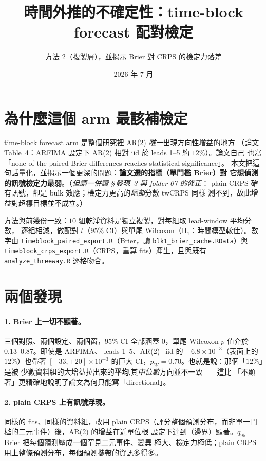 \documentclass[12pt]{article}
\title{\textbf{時間外推的不確定性：time-block forecast 配對檢定}}
\author{方法 2（複製層），並揭示 Brier 對 CRPS 的檢定力落差}
\date{2026 年 7 月}
\begin{document}
\maketitle

\section*{為什麼這個 arm 最該補檢定}

time-block forecast arm 是整個研究裡 AR(2) \emph{唯一}出現方向性增益的地方
（論文 Table~4：ARFIMA 設定下 AR(2) 相對 iid 於 leads 1--5 約 $12\%$）。論文自己
也寫「none of the paired Brier differences reaches statistical significance」。
本文把這句話量化，並揭示一個更深的問題：\textbf{論文選的指標（單門檻 Brier）對
它想偵測的訊號檢定力最弱}。（\emph{但請一併讀 \S\,發現~3 與 folder 07 的修正}：
plain CRPS 確有訊號，卻是 bulk 效應；檢定力更高的\emph{尾部}分數 twCRPS 同樣
測不到，故此增益對超標目標並不成立。）

方法與前幾份一致：$10$ 組乾淨資料是獨立複製，對每組取 lead-window 平均分數，
逐組相減，做配對 $t$（$95\%$ CI）與單尾 Wilcoxon（H$_1$：時間模型較佳）。數字由
\verb|timeblock_paired_export.R|（Brier，讀 \verb|blk1_brier_cache.RData|）與
\verb|timeblock_crps_export.R|（CRPS，重算 fits）產生，且與既有
\verb|analyze_threeway.R| 逐格吻合。

\bigskip


\section*{兩個發現}

\paragraph{1. Brier 上一切不顯著。}三個對照、兩個設定、兩個窗，$95\%$ CI
全部涵蓋 $0$，單尾 Wilcoxon $p$ 值介於 $0.13$--$0.87$。即使是 ARFIMA、
leads 1--5、AR(2)$-$iid 的 $-6.8\times10^{-3}$（表面上的 $12\%$）也帶著
$[-33,+20]\times10^{-3}$ 的巨大 CI，$p_W=0.70$。也就是說：那個「$12\%$」是被
少數資料組的大增益拉出來的\textbf{平均},其\emph{中位數}方向並不一致——這比
「不顯著」更精確地說明了論文為何只能寫「directional」。

\paragraph{2. plain CRPS 上有訊號浮現。}同樣的 fits、同樣的資料組，改用 plain
CRPS（評分整個預測分布，而非單一門檻的二元事件）後，AR(2) 的增益在近單位根
設定下達到（邊界）顯著。$q_{95}$ Brier 把每個預測壓成一個罕見二元事件、變異
極大、檢定力極低；plain CRPS 用上整條預測分布，每個預測攜帶的資訊多得多。
\end{document}
